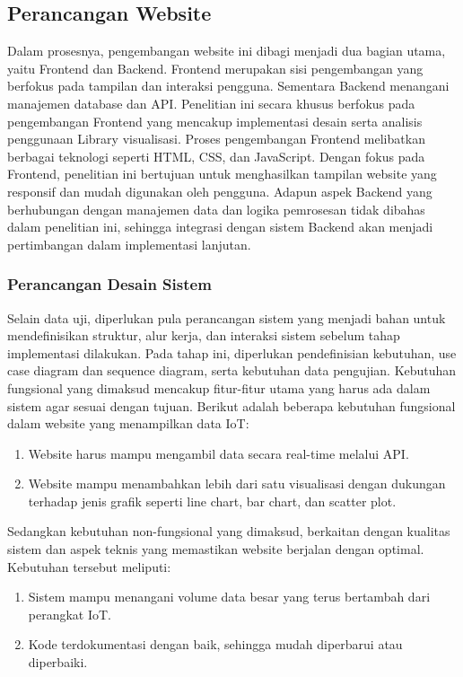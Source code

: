 \subsection{Perancangan Website}
Dalam prosesnya, pengembangan website ini dibagi menjadi dua bagian utama, yaitu Frontend dan Backend. Frontend merupakan sisi pengembangan yang berfokus pada tampilan dan interaksi pengguna. Sementara Backend menangani manajemen database dan API. Penelitian ini secara khusus berfokus pada pengembangan Frontend yang mencakup implementasi desain serta analisis penggunaan Library visualisasi. Proses pengembangan Frontend melibatkan berbagai teknologi seperti HTML, CSS, dan JavaScript. Dengan fokus pada Frontend, penelitian ini bertujuan untuk menghasilkan tampilan website yang responsif dan mudah digunakan oleh pengguna. Adapun aspek Backend yang berhubungan dengan manajemen data dan logika pemrosesan tidak dibahas dalam penelitian ini, sehingga integrasi dengan sistem Backend akan menjadi pertimbangan dalam implementasi lanjutan.

\subsubsection{Perancangan Desain Sistem}
Selain data uji, diperlukan pula perancangan sistem yang menjadi bahan untuk mendefinisikan struktur, alur kerja, dan interaksi sistem sebelum tahap implementasi dilakukan. Pada tahap ini, diperlukan pendefinisian kebutuhan, use case diagram dan sequence diagram, serta kebutuhan data pengujian. Kebutuhan fungsional yang dimaksud mencakup fitur-fitur utama yang harus ada dalam sistem agar sesuai dengan tujuan. Berikut adalah beberapa kebutuhan fungsional dalam website yang menampilkan data IoT:

\begin{enumerate}[label={\arabic*.}]
	\item Website harus mampu mengambil data secara real-time melalui API.
	\item Website mampu menambahkan lebih dari satu visualisasi dengan dukungan terhadap jenis grafik seperti line chart, bar chart, dan scatter plot. 
\end{enumerate}

Sedangkan kebutuhan non-fungsional yang dimaksud, berkaitan dengan kualitas sistem dan aspek teknis yang memastikan website berjalan dengan optimal. Kebutuhan tersebut meliputi: 
\begin{enumerate}[label={\arabic*.}]
	\item Sistem mampu menangani volume data besar yang terus bertambah dari perangkat IoT.
	\item Kode terdokumentasi dengan baik, sehingga mudah diperbarui atau diperbaiki.
\end{enumerate}

